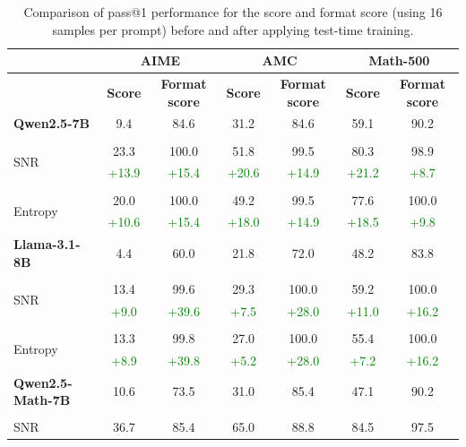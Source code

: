 \begin{table}[b!]
\caption{Comparison of pass@1 performance for the score and format score (using 16 samples per prompt) before and after applying test-time training.}
\label{tab:test-time-training-results-pass1-format-score}
\begin{center}
\footnotesize
\begin{tabular}{lcccccc}
\toprule
     & \multicolumn{2}{c}{\textbf{AIME}} & \multicolumn{2}{c}{\textbf{AMC}} & \multicolumn{2}{c}{\textbf{Math\scriptsize-500\footnotesize}} \\
\midrule
     & \textbf{Score} & \textbf{Format score}  & \textbf{Score} & \textbf{Format score}  & \textbf{Score} & \textbf{Format score}\\
\midrule
\textbf{Qwen2.5-7B} &9.4&  84.6 &31.2& 84.6 &59.1& 90.2\\
\\
\multirow{2}{*}{SNR}  &23.3& 100.0 &51.8& 99.5 &80.3 &98.9 \\
  &\textcolor{green}{+13.9}  & \textcolor{green}{+15.4}   &\textcolor{green}{+20.6}& \textcolor{green}{+14.9}&\textcolor{green}{+21.2}& \textcolor{green}{+8.7} \\
 \\
\multirow{2}{*}{Entropy}  &20.0& 100.0 &49.2& 99.5 &77.6& 100.0\\
 &\textcolor{green}{+10.6}& \textcolor{green}{+15.4} &\textcolor{green}{+18.0}& \textcolor{green}{+14.9} &\textcolor{green}{+18.5}& \textcolor{green}{+9.8} \\
\midrule
\textbf{Llama-3.1-8B} & 4.4& 60.0 & 21.8 & 72.0 &48.2& 83.8\\
\\
\multirow{2}{*}{SNR}  &13.4& 99.6 &29.3& 100.0 &59.2& 100.0 \\
 &\textcolor{green}{+9.0}& \textcolor{green}{+39.6} &\textcolor{green}{+7.5}& \textcolor{green}{+28.0}&\textcolor{green}{+11.0}& \textcolor{green}{+16.2} \\
 \\
\multirow{2}{*}{Entropy}    &13.3& 99.8 &27.0& 100.0 &55.4& 100.0\\
  &\textcolor{green}{+8.9}& \textcolor{green}{+39.8}&\textcolor{green}{+5.2}&  \textcolor{green}{+28.0} &\textcolor{green}{+7.2}& \textcolor{green}{+16.2}\\
\midrule
\textbf{Qwen2.5-Math-7B}  &10.6&  73.5 &31.0& 85.4 &47.1& 90.2\\
\\
\multirow{2}{*}{SNR}   & 36.7& 85.4 &65.0& 88.8 &84.5& 97.5 \\

\end{tabular}
\end{center}
\end{table}
